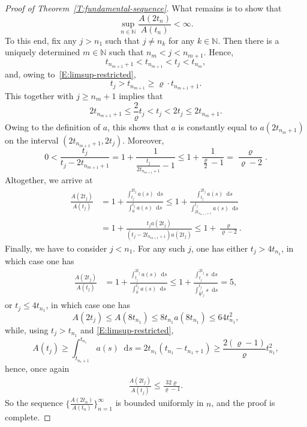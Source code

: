 \documentclass[nointlimits]{amsart}
\numberwithin{equation}{section}
\theoremstyle{plain}
\theoremstyle{definition}
\newcommand{\N}{\mathbb{N}}
\newcommand*\dd{\mathop{}\!\mathrm{d}}
\begin{document}
\begin{proof}[Proof of Theorem~\ref{T:fundamental-sequence}]
What remains is to show that
\begin{equation*}
    \sup_{n\in\N}
    \frac{A(2t_{n})}{A(t_{n})}
    <\infty.
\end{equation*}
To this end, fix any $j> n_1$ such that $j\neq n_k$ for any $k\in\N$. Then there is a uniquely determined $m\in\N$ such that $n_{m}<j<n_{m+1}$. 
Hence,
\begin{equation*}
    t_{n_{m+1}+1}<t_{n_{m+1}}
    <t_j<t_{n_m},
\end{equation*}
and, owing to~\eqref{E:limsup-restricted},
\begin{equation*}
    t_j>t_{n_{m+1}}\ge\varrho
    \cdot  t_{n_{m+1}+1}.
\end{equation*}
This together with $j\geq n_m+1$ implies that
\begin{equation*}
    2t_{n_{m+1}+1}
    \le
    \frac{2}{\varrho}t_j
    <t_j
    <2t_j
    \le
    2t_{n_m+1}.
\end{equation*}
Owing to the definition of $a$, this shows that $a$ is constantly equal to $a(2t_{n_m+1})$ on the interval $(2t_{n_{m+1}+1},2t_j)$.
Moreover,
\begin{equation*}
    0<\frac{t_j}{t_j-2t_{n_{m+1}+1}}
    =
    1+
    \frac{1}{\frac{t_j}{2t_{n_{m+1}+1}}-1}
    \le
    1+\frac{1}{\frac{\varrho}{2}-1}=\frac{\varrho}{\varrho-2}.
\end{equation*}
Altogether, we arrive at
\begin{align*}
    \frac{A(2t_j)}{A(t_j)}
    &=
    1+\frac{\int_{t_j}^{2t_j}a(s)\dd s}
    {\int_{0}^{t_j}a(s)\dd s}
        \le
    1+\frac{\int_{t_j}^{2t_j}a(s)\dd s}{\int_{2t_{n_{m+1}+1}}^{t_j}a(s)\dd s}
        \\
        &=
     1+
     \frac{t_ja(2t_j)}{(t_j-2t_{n_{m+1}+1})a(2t_{j})}
   \le
    1+\frac{\varrho}{\varrho-2}.
    \nonumber
\end{align*}
Finally, we have to consider $j<n_1$. For any such $j$, one has
either $t_j>4t_{n_1}$, in which case one has
\begin{align*}
    \frac{A(2t_j)}{A(t_j)}
    &=
    1+\frac{\int_{t_j}^{2t_j}a(s)\dd s}
    {\int_{0}^{t_j}a(s)\dd s}
        \le
    1+\frac{\int_{t_j}^{2t_j}s\dd s}{\int_{\frac12t_{j}}^{t_j}s\dd s}
       =5,
    \nonumber
\end{align*}
or $t_j\le4t_{n_1}$, in which case one has
\begin{equation*} 
    A(2t_j)\le A(8t_{n_1})\le
    8t_{n_1}a(8t_{n_1})
    \le 64 t_{n_1}^2,
\end{equation*}
while, using $t_j>t_{n_1}$ and \eqref{E:limsup-restricted},
\begin{equation*}
    A(t_j)\ge 
    \int_{t_{n_1+1}}^{t_{n_1}}a(s)\dd s
    =
    2t_{n_1}
    \left(t_{n_1}
    -t_{n_1+1}\right)
    \ge
    \frac{2(\varrho-1)}{\varrho}
    t_{n_1}^2,
\end{equation*}
hence, once again
\begin{align*}
    \frac{A(2t_j)}{A(t_j)}
    \le
    \frac{32\varrho}{\varrho-1}.
\end{align*}
So the sequence $\{\frac{A(2t_n)}{A(t_n)}\}_{n=1}^\infty$ is bounded uniformly in $n$, and the proof is complete.
\end{proof}
\end{document}
